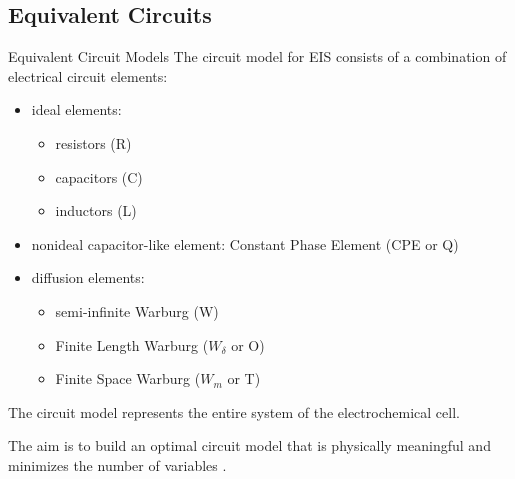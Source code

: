 \documentclass[10pt,compress,handout]{beamer}
\begin{document}
    \subsection{Equivalent Circuits}
    \begin{frame}{Equivalent Circuit Models}
        The circuit model for EIS consists of a combination of electrical circuit elements\citep{orazem2008}:
        \begin{itemize}
            \item ideal elements:
            \begin{itemize}
                \item  resistors (R)
                \item  capacitors (C)
                \item inductors (L)
            \end{itemize}
            \item nonideal capacitor-like element: Constant Phase Element (CPE or Q)
            \item diffusion elements:
            \begin{itemize}
                \item semi-infinite Warburg (W)
                \item Finite Length Warburg ($W_{\delta}$ or O)
                \item Finite Space Warburg ($W_m$ or T)
            \end{itemize}
        \end{itemize}
        The circuit model represents the entire system of the electrochemical cell.
    
        The aim is to build an optimal circuit model that is physically meaningful and minimizes the
        number of variables \citep{boukamp1986}.
    \end{frame}
\end{document}
